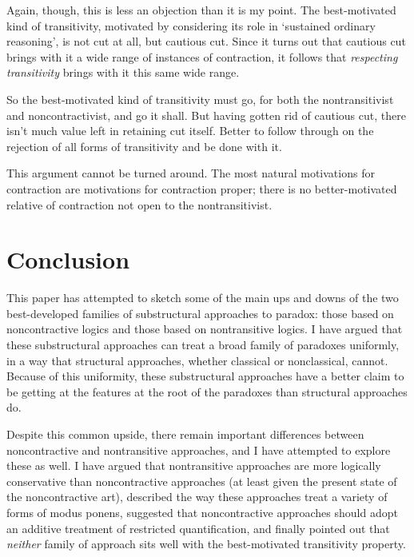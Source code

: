 \documentclass{ergoclass}
\begin{document}
Again, though, this is less an objection than it is my point. The best-motivated kind of transitivity, motivated by considering its role in `sustained ordinary reasoning', is not cut at all, but cautious cut. Since it turns out that cautious cut brings with it a wide range of instances of contraction, it follows that {\em respecting transitivity} brings with it this same wide range. 

So the best-motivated kind of transitivity must go, for both the nontransitivist and noncontractivist, and go it shall. But having gotten rid of cautious cut, there isn't much value left in retaining cut itself. Better to follow through on the rejection of all forms of transitivity and be done with it. 

This argument cannot be turned around. The most natural motivations for contraction are motivations for contraction proper; there is no better-motivated relative of contraction not open to the nontransitivist.





\section{Conclusion} \label{conclusion}

This paper has attempted to sketch some of the main ups and downs of the two best-developed families of substructural approaches to paradox: those based on noncontractive logics and those based on nontransitive logics. I have argued that these substructural approaches can treat a broad family of paradoxes uniformly, in a way that structural approaches, whether classical or nonclassical, cannot. Because of this uniformity, these substructural approaches have a better claim to be getting at the features at the root of the paradoxes than structural approaches do.

Despite this common upside, there remain important differences between noncontractive and nontransitive approaches, and I have attempted to explore these as well. I have argued that nontransitive approaches are more logically conservative than noncontractive approaches (at least given the present state of the noncontractive art), described the way these approaches treat a variety of forms of modus ponens, suggested that noncontractive approaches should adopt an additive treatment of restricted quantification, and finally pointed out that {\em neither} family of approach sits well with the best-motivated transitivity property.
\end{document}

